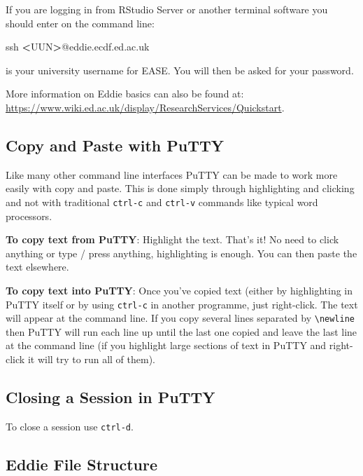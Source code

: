 \documentclass[
]{book}
\newenvironment{Shaded}{\begin{snugshade}}{\end{snugshade}}
\newcommand{\FunctionTok}[1]{\textcolor[rgb]{0.00,0.00,0.00}{#1}}
\newcommand{\NormalTok}[1]{#1}
\newcommand{\OperatorTok}[1]{\textcolor[rgb]{0.81,0.36,0.00}{\textbf{#1}}}
\begin{document}
If you are logging in from RStudio Server or another terminal software you should enter on the command line:

\begin{Shaded}
\begin{Highlighting}[]
\FunctionTok{ssh} \OperatorTok{<}\NormalTok{UUN}\OperatorTok{>}\NormalTok{@eddie.ecdf.ed.ac.uk}
\end{Highlighting}
\end{Shaded}

is your university username for EASE. You will then be asked for your password.

More information on Eddie basics can also be found at: \url{https://www.wiki.ed.ac.uk/display/ResearchServices/Quickstart}.

\hypertarget{copy-and-paste-with-putty}{%
\subsection{Copy and Paste with PuTTY}\label{copy-and-paste-with-putty}}

Like many other command line interfaces PuTTY can be made to work more easily with copy and paste. This is done simply through highlighting and clicking and not with traditional \texttt{ctrl-c} and \texttt{ctrl-v} commands like typical word processors.

\textbf{To copy text from PuTTY}: Highlight the text. That's it! No need to click anything or type / press anything, highlighting is enough. You can then paste the text elsewhere.

\textbf{To copy text into PuTTY}: Once you've copied text (either by highlighting in PuTTY itself or by using \texttt{ctrl-c} in another programme, just right-click. The text will appear at the command line. If you copy several lines separated by \texttt{\textbackslash{}newline} then PuTTY will run each line up until the last one copied and leave the last line at the command line (if you highlight large sections of text in PuTTY and right-click it will try to run all of them).

\hypertarget{closing-a-session-in-putty}{%
\subsection{Closing a Session in PuTTY}\label{closing-a-session-in-putty}}

To close a session use \texttt{ctrl-d}.

\hypertarget{eddie-file-structure}{%
\subsection{Eddie File Structure}\label{eddie-file-structure}}
\end{document}

